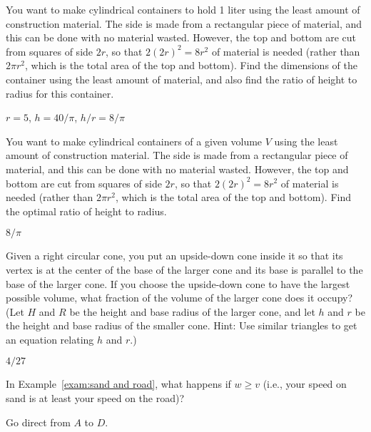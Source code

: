 \begin{exercises}
\begin{exercise}
You want to make cylindrical containers to hold 1 liter using the
least amount of construction material.  The side is made from a
rectangular piece of material, and this can be done with no material
wasted.  However, the top and bottom are cut from squares of side $2r$, so
that $2(2r)^2=8r^2$ of material is needed (rather than $2\pi r^2$, which is
the total area of the top and bottom).  Find the dimensions of the
container using the least amount of material, and also find the
ratio of height to
radius for this container.
\begin{answer} $r=5$, $h=40/\pi$, $h/r=8/\pi$
\end{answer}\end{exercise}

\begin{exercise}
You want to make cylindrical containers of a given volume $V$ using the
least amount of construction material.  The side is made from a
rectangular piece of material, and this can be done with no material
wasted.  However, the top and bottom are cut from squares of side $2r$, so
that $2(2r)^2=8r^2$ of material is needed (rather than $2\pi r^2$, which is
the total area of the top and bottom).  Find the optimal ratio of height to
radius.
\begin{answer} $8/\pi$
\end{answer}\end{exercise}

\begin{exercise}
Given a right circular cone, you put an upside-down cone inside it so that
its vertex is at the center of the base of the larger cone and its base is
parallel to the base of the larger cone.  If you choose the upside-down
cone to have the largest possible volume, what fraction of the volume of
the larger cone does it occupy?  (Let $H$ and $R$ be the height and base
radius of the larger cone, and let $h$ and $r$ be the height and base
radius of the smaller cone.  Hint: Use similar triangles to get an equation
relating $h$ and $r$.)
\begin{answer} $4/27$
\end{answer}\end{exercise}

\begin{exercise}
In Example~\ref{exam:sand and road}, what happens if
$w\ge v$ (i.e., your speed on sand is at least your speed on the
road)?
\begin{answer} Go direct from $A$ to $D$.
\end{answer}\end{exercise}


\end{exercises}
